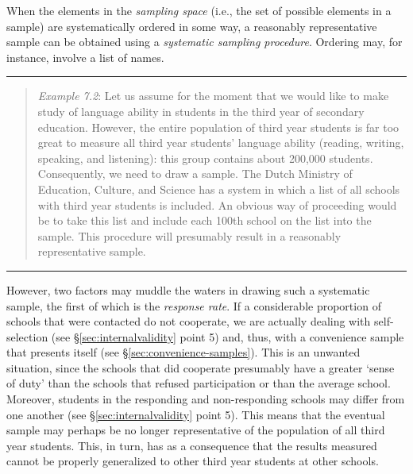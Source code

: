 \documentclass[
]{book}
\begin{document}
When the elements in the \emph{sampling space} (i.e., the set of possible elements in a sample) are systematically ordered in some way, a reasonably representative sample can be obtained using a \emph{systematic sampling procedure}. Ordering may, for instance, involve a list of names.

\begin{center}\rule{0.5\linewidth}{0.5pt}\end{center}

\begin{quote}
\emph{Example 7.2}: Let us assume for the moment that we would like to make study of language ability in students in the third year of secondary education. However, the entire population of third year students is far too great to measure all third year students' language ability (reading, writing, speaking, and listening): this group contains about 200,000 students. Consequently, we need to draw a sample. The Dutch Ministry of Education, Culture, and Science has a system in which a list of all schools with third year students is included. An obvious way of proceeding would be to take this list and include each 100th school on the list into the sample. This procedure will presumably result in a reasonably representative sample.
\end{quote}

\begin{center}\rule{0.5\linewidth}{0.5pt}\end{center}

However, two factors may muddle the waters in drawing such a systematic sample, the first of which is the \emph{response rate}. If a considerable proportion of schools that were contacted do not cooperate, we are actually dealing with self-selection (see §\ref{sec:internalvalidity} point 5) and, thus, with a convenience sample that presents itself (see §\ref{sec:convenience-samples}). This is an unwanted situation, since the schools that did cooperate presumably have a greater `sense of duty' than the schools that refused participation or than the average school. Moreover, students in the responding and non-responding schools may differ from one another (see §\ref{sec:internalvalidity} point 5). This means that the eventual sample may perhaps be no longer representative of the population of all third year students. This, in turn, has as a consequence that the results measured cannot be properly generalized to other third year students at other schools.
\end{document}
